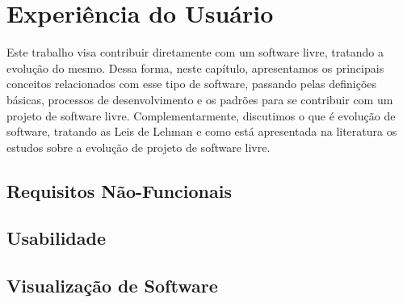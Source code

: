\chapter{Experiência do Usuário}
\label{cap-exp-user}

Este trabalho visa contribuir diretamente com um software livre, tratando a evolução do mesmo. Dessa forma, neste capítulo, apresentamos os principais conceitos relacionados com esse tipo de software, passando pelas definições básicas, processos de desenvolvimento e os padrões para se contribuir com um projeto de software livre. Complementarmente, discutimos o que é evolução de software, tratando as Leis de Lehman e como está apresentada na literatura os estudos sobre a evolução de projeto de software livre.




\section{Requisitos Não-Funcionais}

\section{Usabilidade}

\section{Visualização de Software}

